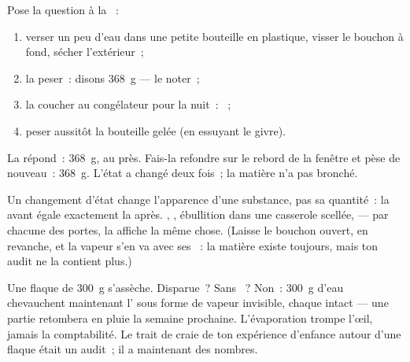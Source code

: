 \begin{method}\label{met:g6:water-states:weigh}
Pose la question à la ~:
\begin{enumerate}
  \item verser un peu d'eau dans une petite bouteille en plastique,
        visser le bouchon à fond, sécher l'extérieur~;
  \item la peser~: disons \qty{368}{g} --- le noter~;
  \item la coucher au congélateur pour la nuit~: ~;
  \item peser aussitôt la bouteille gelée (en essuyant le givre).
\end{enumerate}
La  répond~: \qty{368}{g}, au  près. Fais-la refondre sur
le rebord de la fenêtre et pèse de nouveau~: \qty{368}{g}. L'état a
changé deux fois~; la matière n'a pas bronché.
\end{method}

\begin{proposition}\label{prop:g6:water-states:mass}
Un changement d'état change l'apparence d'une substance, pas sa
quantité~: la  avant égale exactement la  après. ,
, ébullition dans une casserole scellée,
 --- par chacune des portes, la  affiche la même
chose. (Laisse le bouchon ouvert, en revanche, et la vapeur s'en va
avec ses ~: la matière existe toujours, mais ton audit ne la
contient plus.)
\end{proposition}

\begin{example}\label{ex:g6:water-states:puddle}
Une flaque de \qty{300}{g} s'assèche. Disparue~? Sans ~? Non~:
\qty{300}{g} d'eau chevauchent maintenant l' sous forme de vapeur
invisible, chaque  intact --- une partie retombera en pluie la
semaine prochaine. L'évaporation trompe l'œil, jamais la
comptabilité. Le trait de craie de ton expérience d'enfance autour
d'une flaque était un audit~; il a maintenant des nombres.
\end{example}

